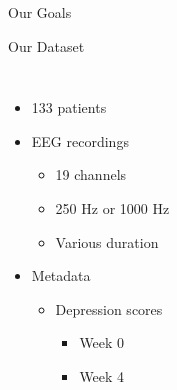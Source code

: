 \documentclass{beamer}
\begin{document}

\begin{frame}{Our Goals}
  
\end{frame}


\begin{frame}{Our Dataset}
	\begin{columns}
        \begin{itemize}
            \item<2-> 133 patients
            \item<3-> EEG recordings
              \begin{itemize}
                \item 19 channels
                \item 250 Hz or 1000 Hz
                \item Various duration
              \end{itemize}
              \item<4-> Metadata
                  \begin{itemize}
                      \item Depression scores
                          \begin{itemize}
                              \item Week 0
                              \item Week 4
                          \end{itemize}

\end{itemize}
\end{itemize}
\end{columns}
\end{frame}
\end{document}
